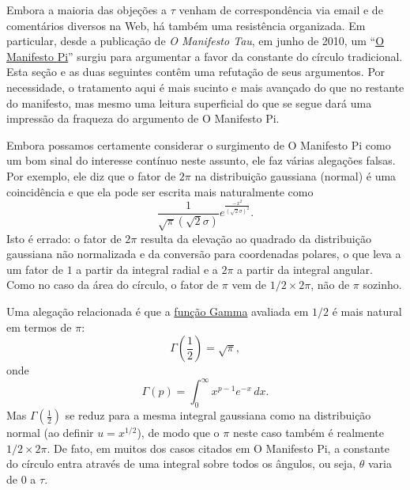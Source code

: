 Embora a maioria das objeções a $\tau$ venham de correspondência via email e de comentários diversos na Web, há também uma resistência organizada. Em particular, desde a publicação de \emph{O Manifesto Tau}, em junho de 2010, um ``\href{http://www.thepimanifesto.com/}{O Manifesto Pi}'' surgiu para argumentar a favor da constante do círculo tradicional. Esta seção e as duas seguintes contêm uma refutação de seus argumentos. Por necessidade, o tratamento aqui é mais sucinto e mais avançado do que no restante do manifesto, mas mesmo uma leitura superficial do que se segue dará uma impressão da fraqueza do argumento de O Manifesto Pi.

Embora possamos certamente considerar o surgimento de O Manifesto Pi como um bom sinal do interesse contínuo neste assunto, ele faz várias alegações falsas. Por exemplo, ele diz que o fator de $2\pi$ na distribuição gaussiana (normal) é uma coincidência e que ela pode ser escrita mais naturalmente como
\[
\frac{1}{\sqrt\pi(\sqrt 2\sigma)}e^{\frac{-x^2}{(\sqrt 2\sigma)^2}}.
\]
Isto é errado: o fator de $2\pi$ resulta da elevação ao quadrado da distribuição gaussiana não normalizada e da conversão para coordenadas polares, o que leva a um fator de $1$ a partir da integral radial e a $2\pi$ a partir da integral angular. Como no caso da área do círculo, o fator de $\pi$ vem de $1/2\times 2\pi$, não de $\pi$ sozinho.

Uma alegação relacionada é que a \href{https://mathworld.wolfram.com/GammaFunction.html}{função Gamma} avaliada em $1/2$ é mais natural em termos de $\pi$:
\[
\Gamma(\textstyle{\frac{1}{2}}) = \sqrt{\pi},
\]
onde
\begin{equation}
\label{eq:gamma}
\Gamma(p) = \int_{0}^{\infty} x^{p-1} e^{-x}\,dx.
\end{equation}
Mas $\Gamma(\frac{1}{2})$ se reduz para a mesma integral gaussiana como na distribuição normal (ao definir $u = x^{1/2}$), de modo que o $\pi$ neste caso também é realmente $1/2\times 2\pi$. De fato, em muitos dos casos citados em O Manifesto Pi, a constante do círculo entra através de uma integral sobre todos os ângulos, ou seja, $\theta$ varia de $0$ a $\tau$.

